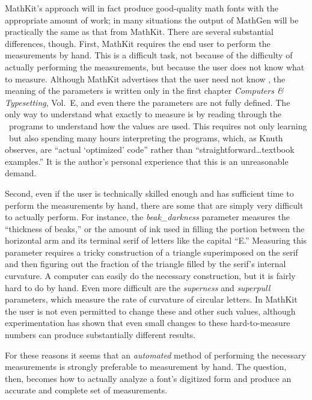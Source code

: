 MathKit's approach will in fact produce good-quality math fonts with the
appropriate amount of work; in many situations the output of MathGen will be
practically the same as that from MathKit. There are several substantial
differences, though. First, MathKit requires the end user to perform the
measurements by hand. This is a difficult task, not because of the difficulty of
actually performing the measurements, but because the user does not know what to
measure. Although MathKit advertises that the user need not know \MF, the
meaning of the parameters is written only in the first chapter \emph{Computers
\& Typesetting}, Vol.\ E, and even there the parameters are not fully defined.
The only way to understand what exactly to measure is by reading through the
\MF\ programs to understand how the values are used. This requires not only
learning \MF\ but also spending many hours interpreting the programs, which, as
Knuth observes, are ``actual `optimized' code'' rather than
``straightforward\ldots textbook examples.'' It is the author's personal
experience that this is an unreasonable demand.

Second, even if the user is technically skilled enough and has sufficient time
to perform the measurements by hand, there are some that are simply very
difficult to actually perform. For instance, the \emph{beak\_darkness} parameter
measures the ``thickness of beaks,'' or the amount of ink used in filling the
portion between the horizontal arm and its terminal serif of letters like the
capital ``E.'' Measuring this parameter requires a tricky construction of a
triangle superimposed on the serif and then figuring out the fraction of the
triangle filled by the serif's internal curvature. A computer can easily do the
necessary construction, but it is fairly hard to do by hand. Even more difficult
are the \emph{superness} and \emph{superpull} parameters, which measure the rate
of curvature of circular letters. In MathKit the user is not even permitted to
change these and other such values, although experimentation has shown that even
small changes to these hard-to-measure numbers can produce substantially
different results.

For these reasons it seems that an \emph{automated} method of performing the
necessary measurements is strongly preferable to measurement by hand. The
question, then, becomes how to actually analyze a font's digitized form and
produce an accurate and complete set of measurements.
